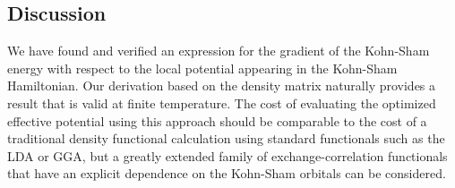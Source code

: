 \documentclass{article}
\newcommand{\beas}{\begin{eqnarray*}}
\newcommand{\enas}{\end{eqnarray*}}
\newcommand{\bea}{\begin{eqnarray}} \newcommand{\ena}{\end{eqnarray}}
\newcommand{\q}{k} \newcommand{\proof}{ {\bf Proof:} }
\def\squarebox#1{\hbox to #1{\hfill\vbox to #1{\vfill}}}
\newcommand{\qed}{\hfill\hfill\vbox{\hrule\hbox{\vrule\squarebox
{.667em}\vrule}\hrule}\smallskip} \newcommand{\level}{\mbox{$\theta$}}
\newcommand{\vspan}{\mbox{span}} \newcommand{\supp}{\mbox{supp}}
\newcommand{\trace}{\mbox{tr}} \newcommand{\real}{\mathcal Re}
\newcommand{\imag}{\mathcal Im} \newcommand{\diag}{\mbox{diag}}
\newcommand{\offd}{\mbox{off}} \newcommand{\low}{\mbox{low}}
\newcommand{\half}{{\frac{1}{2}}} \newcommand{\quarter}{{\frac{1}{4}}}
\newcommand{\eighth}{{\frac{1}{8}}} \newcommand{\Det}{\mbox{det}}
\newcommand{\rank}{\mbox{rank}}
\newcommand{\eig}{\mbox{{\bf eig}}}
\newcommand{\vect}{\mbox{vec}}
\newcommand{\integers}{\mbox{Z}}
\newcommand{\field}{\mathbb{F}}
\newcommand{\reals}{\mathbb{R}}
\newcommand{\complexes}{\mathbb{C}}
\newcommand{\nullspace}{Null}
\newcommand{\Rl}{\mathbb{R}}
\newcommand{\Nl}{\mathbb{N}}
\newcommand{\Ir}{\mathbb{Z}}
\newcommand{\Cx}{\mathbb{C}}
\newcommand{\A}{\mathcal{A}}
\newcommand{\HH}{\mathcal{H}}
\newcommand{\LL}{\mbox{ad}}
\newcommand{\KK}{\mathcal{K}}
\newcommand{\N}{\mathcal{N}}
\newcommand{\Proj}{{\rm Proj}}
\newcommand{\Span}{{\rm span}}
\newcommand{\abs}[1]{\lvert#1\rvert}
\newcommand{\paren}[1]{\left({#1}\right)}
\newcommand{\bparen}[1]{\left\{{#1}\right\}}
\newcommand{\brparen}[1]{\left[{#1}\right]}
\newcommand{\norm}[1]{\left|\left|{#1}\right|\right|}
\newcommand{\inp}[1]{\left<{#1}\right>}
\newcommand{\floor}[1]{\left\lfloor{#1}\right\rfloor}
\newcommand{\ceil}[1]{\left\lceil{#1}\right\rceil}
\newcommand{\ket}[1]{\lvert#1\rangle}
\begin{document}
\subsection{Discussion}

We have found and verified an expression for the gradient of the Kohn-Sham energy with
respect to the local potential appearing in the Kohn-Sham Hamiltonian.  Our derivation
based on the density matrix naturally provides a result that is valid at finite temperature.
The cost of evaluating the optimized effective potential using this approach should be
comparable to the cost of a traditional density functional calculation using standard
functionals such as the LDA or GGA, but a greatly extended family of exchange-correlation
functionals that have an explicit dependence on the Kohn-Sham orbitals can be considered.

%
%
%
%
\end{document}
